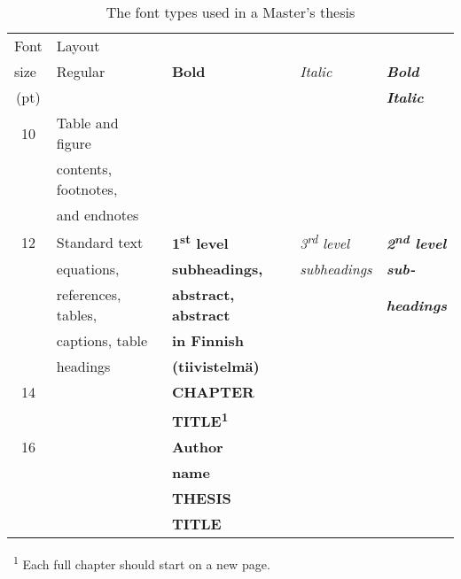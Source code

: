 \begin{table}[!ht]
  \def\arraystretch{1.1}%
  \begin{center}
    \caption{The font types used in a Master’s thesis}
    \label{tab:sample_table}
    \begin{tabular}{| c | l | l | l | l |}
      \hline
      \multicolumn{1}{|l|}{Font}  & \multicolumn{4}{l|}{Layout}
      \\\cline{2-5} \multicolumn{1}{|l|}{size} & Regular &
      \textbf{Bold} & \textit{Italic} & \textbf{\textit{Bold}} \\(pt)
      &  &  &  & \textbf{\textit{Italic}}\\
      \hline
      10 &  {\fontsize{10}{12pt}\selectfont Table and figure} &  &  &  \\
      &  {\fontsize{10}{12pt}\selectfont contents, footnotes,} &  &  &  \\
      &  {\fontsize{10}{12pt}\selectfont and endnotes} &  &  &  \\
      \hline
      12 & Standard text &  \textbf{1\textsuperscript{st} level} &
      \textit{3\textsuperscript{rd} level} &
      \textbf{\textit{2\textsuperscript{nd} level}}\\
      &  equations, &  \textbf{subheadings,} &  \textit{subheadings}
      &  \textbf{\textit{sub-}} \\
      & references, tables, & \textbf{abstract, abstract} &  &
      \textbf{\textit{headings}} \\
      & captions, table & \textbf{in Finnish} &  &  \\
      & headings & \textbf{(tiivistelmä)} &  &  \\
      \hline
      \rule{0pt}{0.8\normalbaselineskip}
      14 &  & {\fontsize{14}{17pt}\selectfont \textbf{CHAPTER}} &  &  \\
      &  & {\fontsize{14}{17pt}\selectfont
      \textbf{TITLE\textsuperscript{1}}} &  &  \\
      \hline
      \rule{0pt}{1.0\normalbaselineskip}
      16 &  & {\fontsize{16}{19pt}\selectfont \textbf{Author}} &  &  \\
      &  & {\fontsize{16}{19pt}\selectfont \textbf{name}} &  &  \\
      \hline
      \rule{0pt}{1.1\normalbaselineskip}
      {\fontsize{16}{19pt}\selectfont 18} &  &
      {\fontsize{18}{22pt}\selectfont \textbf{THESIS}} &  &  \\
      &  & {\fontsize{18}{22pt}\selectfont \textbf{TITLE}} &  &  \\
      \hline
    \end{tabular}
    \vspace{6pt}

  \raggedright \ \space \textsuperscript{1} Each full chapter should
  start on a new page.
\end{center}
\end{table}

